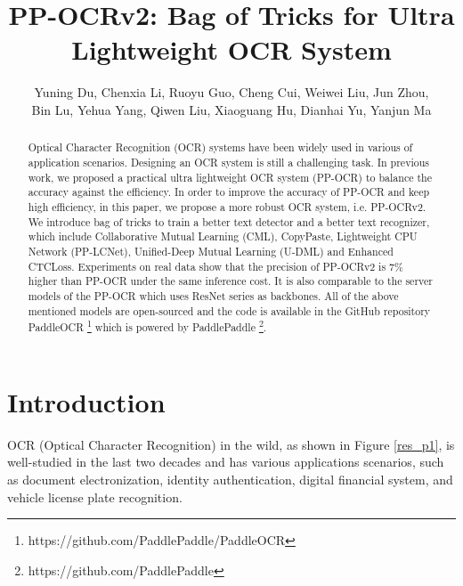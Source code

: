 \documentclass[letterpaper]{article} %
\title{PP-OCRv2: Bag of Tricks for Ultra Lightweight OCR System}
\author {
    Yuning Du, Chenxia Li, Ruoyu Guo, Cheng Cui, Weiwei Liu, Jun Zhou, \\
    Bin Lu, Yehua Yang, Qiwen Liu, Xiaoguang Hu, Dianhai Yu, Yanjun Ma \\
}
\begin{document}
\maketitle

\begin{abstract}
Optical Character Recognition (OCR) systems have been widely used in various of application scenarios. Designing an OCR system is still a challenging task. In previous work, we proposed a practical ultra lightweight OCR system (PP-OCR) to balance the accuracy against the efficiency. In order to improve the accuracy of PP-OCR and keep high efficiency, in this paper, we propose a more robust OCR system, i.e. PP-OCRv2. We introduce bag of tricks to train a better text detector and a better text recognizer, which include Collaborative Mutual Learning (CML),  CopyPaste, Lightweight CPU Network (PP-LCNet), Unified-Deep Mutual Learning (U-DML) and Enhanced CTCLoss. Experiments on real data show that the precision of PP-OCRv2 is 7\% higher than PP-OCR under the same inference cost. It is also comparable to the server models of the PP-OCR which uses ResNet series as backbones. All of the above mentioned models are open-sourced and the code is available in the GitHub repository PaddleOCR \footnote{https://github.com/PaddlePaddle/PaddleOCR} which is powered by PaddlePaddle \footnote{https://github.com/PaddlePaddle}.
\end{abstract}

\section{Introduction}
OCR (Optical Character Recognition) in the wild, as shown in Figure \ref{res_p1}, is well-studied in the last two decades and has various applications scenarios, such as document electronization, identity authentication, digital financial system, and vehicle license plate recognition.
\end{document}
